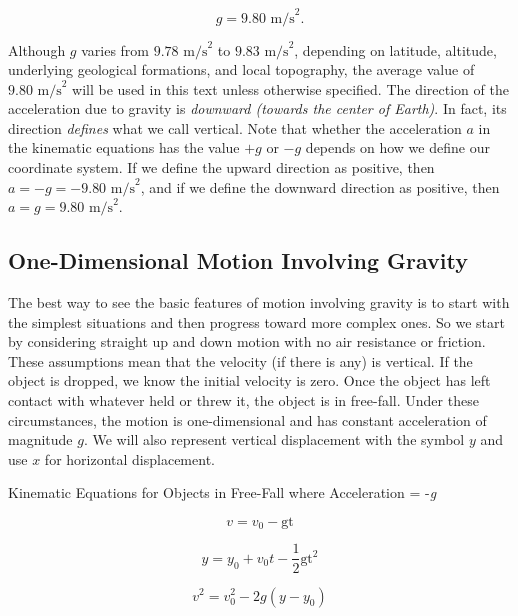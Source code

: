 \documentclass[
]{book}
\newenvironment{note}{}{}
\begin{document}
\leavevmode\hypertarget{eip-636}{}%
\[{{g = 9}\text{.}\text{80\ m/s}^{2}}\text{.}{}\]

Although \(g{}\) varies from \({9\text{.}\text{78\ m/s}^{2}}{}\) to
\({9\text{.}\text{83\ m/s}^{2}}{}\), depending on latitude, altitude,
underlying geological formations, and local topography, the average
value of \({9\text{.}\text{80\ m/s}^{2}}{}\) will be used in this text
unless otherwise specified. The direction of the acceleration due to
gravity is \emph{downward (towards the center of Earth)}. In fact, its
direction \emph{defines} what we call vertical. Note that whether the
acceleration \(a{}\) in the kinematic equations has the value \({+ g}{}\) or
\({- g}{}\) depends on how we define our coordinate system. If we define
the upward direction as positive, then
\({{{a = {- g}} = {- 9}}\text{.}\text{80\ m/s}^{2}}{}\), and if we define
the downward direction as positive, then
\({{{a = g} = 9}\text{.}\text{80\ m/s}^{2}}{}\).

\hypertarget{fs-id2854808}{}
\hypertarget{one-dimensional-motion-involving-gravity}{%
\subsection{One-Dimensional Motion Involving Gravity}\label{one-dimensional-motion-involving-gravity}}

The best way to see the basic features of motion involving gravity is to
start with the simplest situations and then progress toward more complex
ones. So we start by considering straight up and down motion with no air
resistance or friction. These assumptions mean that the velocity (if
there is any) is vertical. If the object is dropped, we know the initial
velocity is zero. Once the object has left contact with whatever held or
threw it, the object is in free-fall. Under these circumstances, the
motion is one-dimensional and has constant acceleration of magnitude
\(g{}\). We will also represent vertical displacement with the symbol
\(y{}\) and use \(x{}\) for horizontal displacement.

\hypertarget{fs-id1931991}{}
\begin{note}

Kinematic Equations for Objects in Free-Fall where Acceleration = -\emph{g}

\leavevmode\hypertarget{import-auto-id2222965}{}%
\[{v = {v_{0} - \text{gt}}}{}\]

\leavevmode\hypertarget{import-auto-id4048491}{}%
\[{{y = {y_{0} + v_{0}}}{t - \frac{1}{2}}\text{gt}^{2}}{}\]

\leavevmode\hypertarget{import-auto-id4019890}{}%
\[{{v^{2} = {v_{0}^{2} - 2g}}\left( {y - y_{0}} \right)}{}\]

\end{note}
\end{document}
